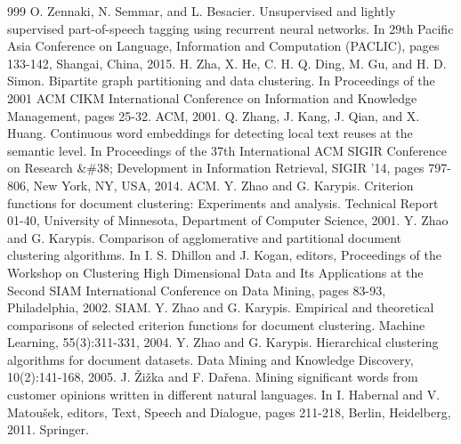 \documentclass[11pt,openany,executivepaper]{book}
\begin{document}
\begin{thebibliography}{999}
 O. Zennaki, N. Semmar, and L. Besacier. Unsupervised and lightly supervised part-of-speech tagging using recurrent neural networks. In 29th Pacific Asia Conference on Language, Information and Computation (PACLIC), pages 133-142, Shangai, China, 2015.
 H. Zha, X. He, C. H. Q. Ding, M. Gu, and H. D. Simon. Bipartite graph partitioning and data clustering. In Proceedings of the 2001 ACM CIKM International Conference on Information and Knowledge Management, pages 25-32. ACM, 2001.
 Q. Zhang, J. Kang, J. Qian, and X. Huang. Continuous word embeddings for detecting local text reuses at the semantic level. In Proceedings of the 37th International ACM SIGIR Conference on Research \&\#38; Development in Information Retrieval, SIGIR '14, pages 797-806, New York, NY, USA, 2014. ACM.
 Y. Zhao and G. Karypis. Criterion functions for document clustering: Experiments and analysis. Technical Report 01-40, University of Minnesota, Department of Computer Science, 2001.
 Y. Zhao and G. Karypis. Comparison of agglomerative and partitional document clustering algorithms. In I. S. Dhillon and J. Kogan, editors, Proceedings of the Workshop on Clustering High Dimensional Data and Its Applications at the Second SIAM International Conference on Data Mining, pages 83-93, Philadelphia, 2002. SIAM.
 Y. Zhao and G. Karypis. Empirical and theoretical comparisons of selected criterion functions for document clustering. Machine Learning, 55(3):311-331, 2004.
 Y. Zhao and G. Karypis. Hierarchical clustering algorithms for document datasets. Data Mining and Knowledge Discovery, 10(2):141-168, 2005.
 J. Žižka and F. Dařena. Mining significant words from customer opinions written in different natural languages. In I. Habernal and V. Matoušek, editors, Text, Speech and Dialogue, pages 211-218, Berlin, Heidelberg, 2011. Springer.

\end{thebibliography}
\endgroup
\end{document}
